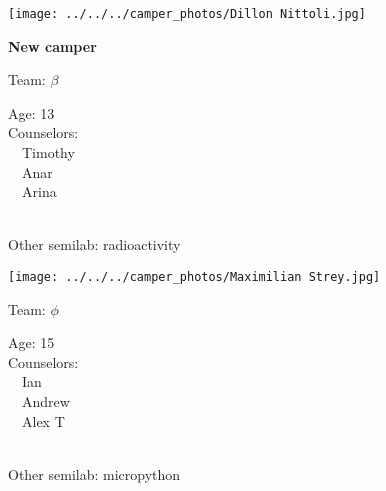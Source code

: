 \documentclass[10pt,letterpaper, landscape]{article}
\begin{document}
\horizontalshiftfornextsticker
\renewcommand{\baselinestretch}{1} \begin{sticker}
\noindent\begin{minipage}{0.5\textwidth}\texttt{[image: ../../../camper\_photos/Dillon Nittoli.jpg]}\end{minipage}\begin{minipage}{0.45\textwidth}
\textbf{New camper} 

Team: {\Large $\beta$}

Age:        13\\
Counselors: \\\ \ Timothy\\\ \ Anar\\\ \ Arina\\
\end{minipage} \\ \vspace{0.07in}
Other semilab: radioactivity
\end{sticker}
\verticalshiftfornextsticker
\renewcommand{\baselinestretch}{1} \begin{sticker}
\noindent\begin{minipage}{0.5\textwidth}\texttt{[image: ../../../camper\_photos/Maximilian Strey.jpg]}\end{minipage}\begin{minipage}{0.45\textwidth}
Team: {\Large $\phi$}

Age:        15\\
Counselors: \\\ \ Ian\\\ \ Andrew\\\ \ Alex T\\
\end{minipage} \\ \vspace{0.07in}
Other semilab: micropython
\end{sticker}
\horizontalshiftfornextsticker
\end{document}
